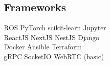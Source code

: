 \documentclass[]{deedy-resume}
\begin{document}
\begin{minipage}[t]{0.33\textwidth}
\subsection{Frameworks}
ROS \textbullet{} PyTorch \textbullet{} scikit-learn \textbullet{} Jupyter \\
ReactJS \textbullet{} NextJS \textbullet{} NestJS \textbullet{} Django \\
Docker \textbullet{} Ansible \textbullet{} Terraform \\
gRPC \textbullet{} SocketIO \textbullet{} WebRTC (basic)


%
%

\end{minipage}
\hfill
\end{document}

